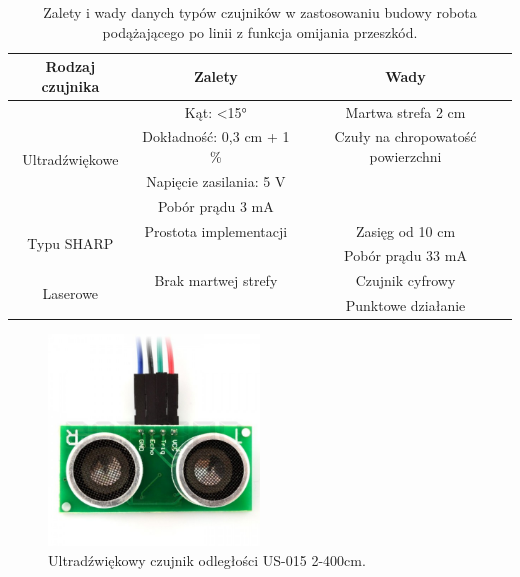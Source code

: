 \begin{table}[H]
\centering
\begin{tabular}{c|c|c}
\textbf{Rodzaj czujnika}        & \textbf{Zalety}           & \textbf{Wady}                     \\ \hline
\multirow{4}{*}{Ultradźwiękowe} & Kąt: \textless 15°        & Martwa strefa 2 cm                \\
                                & Dokładność: 0,3 cm + 1 \% & Czuły na chropowatość powierzchni \\
                                & Napięcie zasilania: 5 V   &                                   \\
                                & Pobór prądu 3 mA          &                                   \\ \hline
\multirow{2}{*}{Typu SHARP}     & Prostota implementacji    & Zasięg od 10 cm                   \\
                                &                           & Pobór prądu 33 mA                 \\ \hline
\multirow{2}{*}{Laserowe}       & Brak martwej strefy       & Czujnik cyfrowy                   \\
                                &                           & Punktowe działanie               
\end{tabular}
\caption{\label{tab:odleglosc}Zalety i wady danych typów czujników w zastosowaniu budowy robota podążającego po linii z funkcja omijania przeszkód. \cite{czujniki, sharp, laser}} 
\end{table}
\begin{figure}[H]
\centering
\includegraphics[width=0.5\textwidth]{inzynierku/img/czujnik.jpg}
\caption{\label{fig:czujnik_ultradzwiekowy}Ultradźwiękowy czujnik odległości US-015 2-400cm.}
\end{figure}

